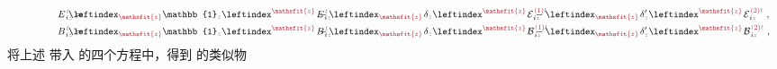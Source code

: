 \begin{subequations} \label{eq:EB-01}
	\belowdisplayskip=14pt
\begin{align}
	\hphantom{xxxxxxxxx} E^{\;\!\mathcolor{gray}{t}}_{\;\! i\mathcolor{gray}{z}} &= &&\hspace{-2.5em}\leftindex_{\textcolor{Maroon}{\mathsfit{z}}} {\mathbb{1}}_{\mathcolor{gray}{z}} \leftindex^{\textcolor{Maroon}{\mathsfit{z}}} \;\! E^{\;\!\mathcolor{gray}{t}}_{\;\! i\mathcolor{gray}{z}} &&\hspace{-2.5em}- \leftindex_{\textcolor{Maroon}{\mathsfit{z}}} \;\! \delta_{\mathcolor{gray}{z}} \leftindex^{\textcolor{Maroon}{\mathsfit{z}}} \;\!
	{\mathcal{E}}^{\;\!\textcolor{Maroon}{(1)}\mathcolor{gray}{t}}_{\;\! i\mathcolor{gray}{z}} &&\hspace{-2.5em}- \leftindex_{\textcolor{Maroon}{\mathsfit{z}}} \;\! \delta'_{\mathcolor{gray}{z}} \leftindex^{\textcolor{Maroon}{\mathsfit{z}}} \;\! {\mathcal{E}}^{\;\!\textcolor{Maroon}{(2)}\mathcolor{gray}{t}}_{\;\! i\mathcolor{gray}{z}} ~,&& \label{eq:E-01} \\
	\hphantom{xxxxxxxxx} B^{\;\!\mathcolor{gray}{t}}_{\;\! i\mathcolor{gray}{z}} &= &&\hspace{-2.5em}\leftindex_{\textcolor{Maroon}{\mathsfit{z}}} {\mathbb{1}}_{\mathcolor{gray}{z}} \leftindex^{\textcolor{Maroon}{\mathsfit{z}}} \;\! B^{\;\!\mathcolor{gray}{t}}_{\;\! i\mathcolor{gray}{z}} &&\hspace{-2.5em}- \leftindex_{\textcolor{Maroon}{\mathsfit{z}}} \;\! \delta_{\mathcolor{gray}{z}} \leftindex^{\textcolor{Maroon}{\mathsfit{z}}} \;\!
	{\mathcal{B}}^{\;\!\textcolor{Maroon}{(1)}\mathcolor{gray}{t}}_{\;\! i\mathcolor{gray}{z}} &&\hspace{-2.5em}- \leftindex_{\textcolor{Maroon}{\mathsfit{z}}} \;\! \delta'_{\mathcolor{gray}{z}} \leftindex^{\textcolor{Maroon}{\mathsfit{z}}} \;\! {\mathcal{B}}^{\;\!\textcolor{Maroon}{(2)}\mathcolor{gray}{t}}_{\;\! i\mathcolor{gray}{z}} ~,&& \label{eq:B-01}
\end{align}
\end{subequations}
将上述  带入  的四个方程中，得到  的类似物
